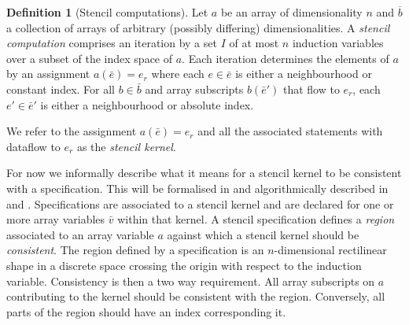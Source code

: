 \documentclass[10pt,preprint]{sigplanconf}
\newcommand{\dnote}[1]{\textcolor{darkpurple}{Dom: #1}}
\newcounter{block}
\theoremstyle{definition}
\newtheorem{definition}[block]{Definition}
\begin{document}
\begin{definition}[Stencil computations]
\label{def:stencil}
  Let $a$ be an array of dimensionality $n$ and $\overline{b}$ a
  collection of arrays of arbitrary (possibly differing)
  dimensionalities.
  A \emph{stencil computation} comprises an iteration by a set $I$ of at
  most $n$ induction variables
  over a subset of the index space of $a$. Each iteration
  determines the elements of $a$ by an
  assignment $a(\bar{e}) = e_r$ where each $e \in
  \bar{e}$ is either a neighbourhood or constant index.
  For all $b \in \bar{b}$ and array subscripts $b(\bar{e}')$
  that flow to $e_r$, each $e' \in \bar{e}'$ is
  either a neighbourhood or absolute index.

  We refer to the assignment $a(\bar{e}) = e_r$ and all the associated
  statements with dataflow to $e_r$ as the \emph{stencil kernel}.
\end{definition}
%
%

For now we informally describe what it means for a stencil kernel to
be consistent with a specification. This will be formalised in
 and algorithmically described in and
.  Specifications are associated to a stencil
kernel and are declared for one or more array variables $\bar{v}$
within that kernel.  A stencil specification defines a \emph{region}
associated to an array variable $a$ against which a stencil kernel
should be \emph{consistent}. The region defined by a specification is
an $n$-dimensional rectilinear shape in a discrete space crossing the
origin with respect to the induction variable. Consistency is then a
two way requirement. All array subscripts on $a$ contributing to the
kernel should be consistent with the region. Conversely, all parts of
the region should have an index corresponding it.
\end{document}
